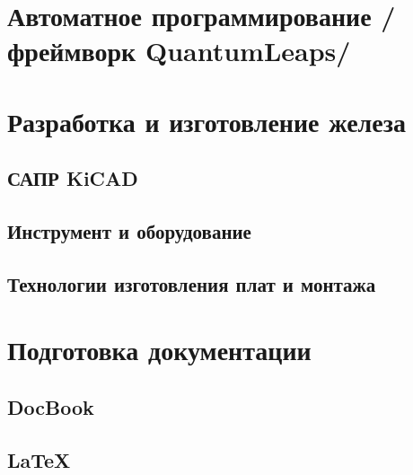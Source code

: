 \part{Автоматное программирование /фреймворк QuantumLeaps/}

\part{Разработка и изготовление железа}
\chapter{САПР KiCAD}
\chapter{Инструмент и оборудование}
\chapter{Технологии изготовления плат и монтажа}

\part{Подготовка документации}
\chapter{DocBook}
\chapter{\LaTeX}




